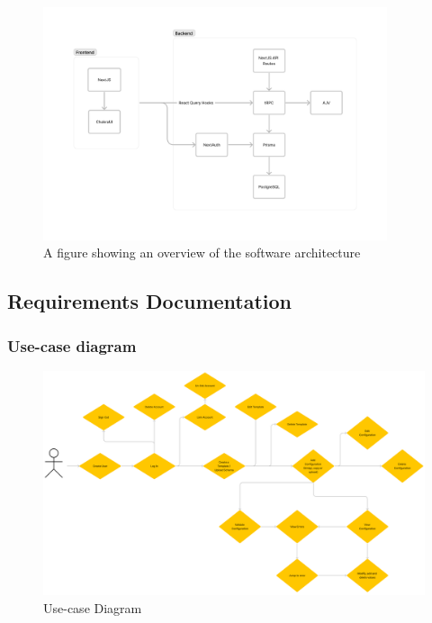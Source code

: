 \begin{figure}[!ht]
    \begin{minipage}{1\textwidth}
    \centering
     \includegraphics[width=0.9\textwidth]{Figures/appendix/architecture-overview-new.pdf}
     \caption[Overview of the software architecture]{A figure showing an overview of the software architecture}
     \label{architecture:overview}
    \end{minipage}\hfill
\end{figure}

\newpage

\subsection{Requirements Documentation}

\subsubsection{Use-case diagram}

\begin{figure}[!ht]
  \begin{minipage}{1\textwidth}
    \centering
    \includegraphics[width=1\textwidth]{Figures/appendix/UseCaseDiagram.pdf}
    \caption{Use-case Diagram}
    \label{usecasediagram}
  \end{minipage}\hfill
\end{figure}

